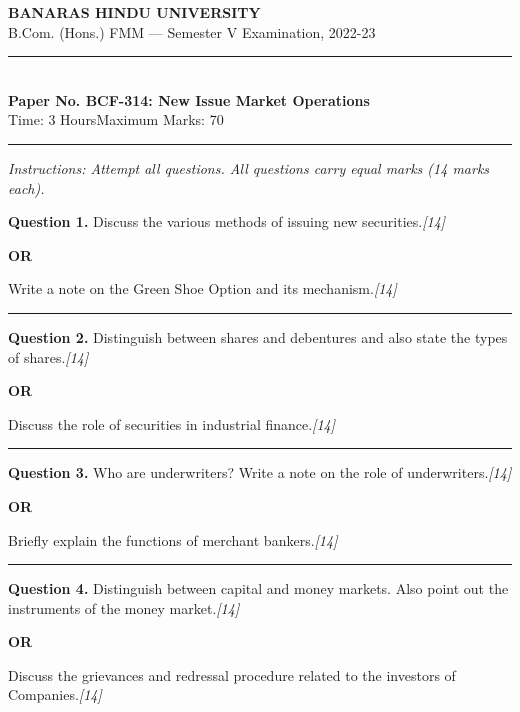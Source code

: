 \documentclass[11pt,a4paper]{article}
\newcommand{\pts}[1]{\hfill   \textit{[#1]}}
\begin{document}
\begin{center}
  {\large\bfseries BANARAS HINDU UNIVERSITY}\\[2pt]
  {\normalsize B.Com. (Hons.) FMM --- Semester V Examination, 2022-23}\\[6pt]
  \rule{0.8\linewidth}{0.5pt}\\[6pt]
  {\large\bfseries Paper No. BCF-314: New Issue Market Operations}\\[4pt]
  {\normalsize Time: 3 Hours\hfill Maximum Marks: 70}
\end{center}

\rule{\linewidth}{0.4pt}

\smallskip



\noindent   \textit{Instructions: Attempt all questions. All questions carry equal marks (14 marks each).}

\bigskip




\noindent   \textbf{Question 1.}
Discuss the various methods of issuing new securities.\pts{14}

\centerline{   \textbf{OR}}

Write a note on the Green Shoe Option and its mechanism.\pts{14}

\medskip\rule{\linewidth}{0.2pt}




\noindent   \textbf{Question 2.}
Distinguish between shares and debentures and also state the types of shares.\pts{14}

\centerline{   \textbf{OR}}

Discuss the role of securities in industrial finance.\pts{14}

\medskip\rule{\linewidth}{0.2pt}




\noindent   \textbf{Question 3.}
Who are underwriters? Write a note on the role of underwriters.\pts{14}

\centerline{   \textbf{OR}}

Briefly explain the functions of merchant bankers.\pts{14}

\medskip\rule{\linewidth}{0.2pt}




\noindent   \textbf{Question 4.}
Distinguish between capital and money markets. Also point out the instruments of the money market.\pts{14}

\centerline{   \textbf{OR}}

Discuss the grievances and redressal procedure related to the investors of Companies.\pts{14}
\end{document}
